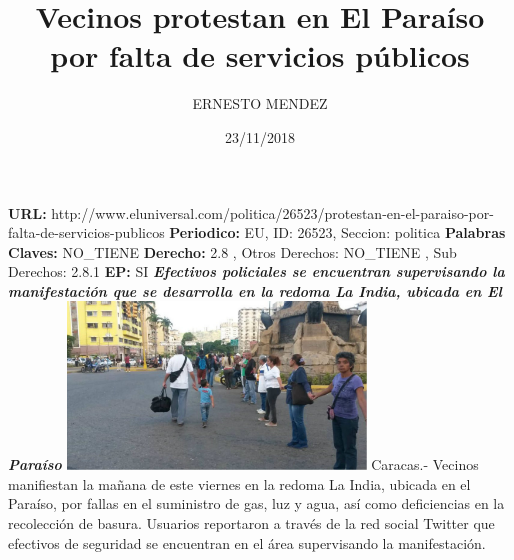 \documentclass{article}%
\title{\textbf{Vecinos protestan en El Paraíso por falta de servicios públicos}}%
\author{ERNESTO MENDEZ}%
\date{23/11/2018}%
\begin{document}
%
\normalsize%
\maketitle%
\textbf{URL: }%
http://www.eluniversal.com/politica/26523/protestan{-}en{-}el{-}paraiso{-}por{-}falta{-}de{-}servicios{-}publicos\newline%
%
\textbf{Periodico: }%
EU, %
ID: %
26523, %
Seccion: %
politica\newline%
%
\textbf{Palabras Claves: }%
NO\_TIENE\newline%
%
\textbf{Derecho: }%
2.8%
, Otros Derechos: %
NO\_TIENE%
, Sub Derechos: %
2.8.1%
\newline%
%
\textbf{EP: }%
SI\newline%
\newline%
%
\textbf{\textit{Efectivos policiales se encuentran supervisando la manifestación que se desarrolla en la redoma La India, ubicada en El Paraíso}}%
\newline%
\newline%
%
\includegraphics[width=300px]{127.jpg}%
\newline%
%
Caracas.{-} Vecinos manifiestan la mañana de este viernes en%
\newline%
%
la redoma La India, ubicada en el Paraíso, por fallas en el suministro de gas, luz y agua, así como deficiencias en la recolección de basura.%
\newline%
%
Usuarios reportaron a través de la red social Twitter que efectivos de seguridad se encuentran en el área supervisando la manifestación.%
\newline%
%
\end{document}

